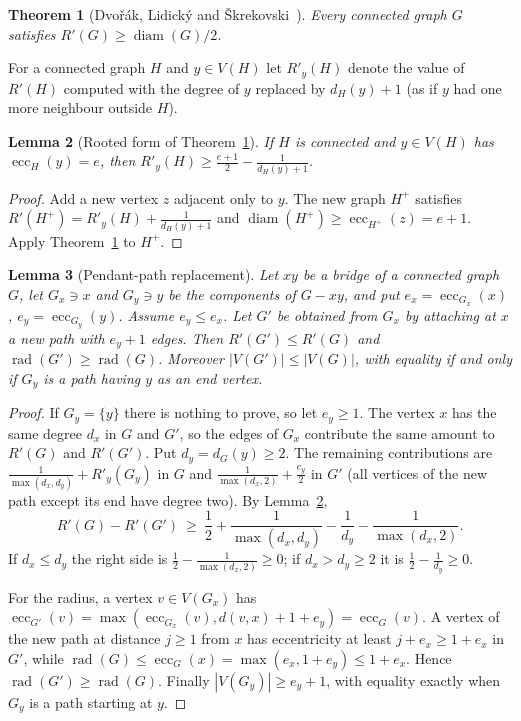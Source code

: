 \documentclass[11pt]{amsart}
\newtheorem{theorem}{Theorem}[section]
\newtheorem{lemma}[theorem]{Lemma}
\theoremstyle{definition}
\DeclareMathOperator{\rad}{rad}
\DeclareMathOperator{\diam}{diam}
\DeclareMathOperator{\ecc}{ecc}
\newcommand{\Rp}{R'}
\begin{document}
\begin{theorem}[Dvo\v{r}\'ak, Lidick\'y and \v{S}krekovski~\cite{DLS}]\label{thm:DLS}
Every connected graph $G$ satisfies $\Rp(G)\ge\diam(G)/2$.
\end{theorem}

For a connected graph $H$ and $y\in V(H)$ let $\Rp_{y}(H)$ denote the value of $\Rp(H)$ computed with the degree of $y$
replaced by $d_H(y)+1$ (as if $y$ had one more neighbour outside $H$).

\begin{lemma}[Rooted form of Theorem~\ref{thm:DLS}]\label{lem:rooted}
If $H$ is connected and $y\in V(H)$ has $\ecc_H(y)=e$, then $\Rp_y(H)\ge\frac{e+1}2-\frac1{d_H(y)+1}$.
\end{lemma}

\begin{proof}
Add a new vertex $z$ adjacent only to $y$. The new graph $H^+$ satisfies $\Rp(H^+)=\Rp_y(H)+\frac1{d_H(y)+1}$ and
$\diam(H^+)\ge\ecc_{H^+}(z)=e+1$. Apply Theorem~\ref{thm:DLS} to $H^+$.
\end{proof}

\begin{lemma}[Pendant-path replacement]\label{lem:replace}
Let $xy$ be a bridge of a connected graph $G$, let $G_x\ni x$ and $G_y\ni y$ be the components of $G-xy$, and put
$e_x=\ecc_{G_x}(x)$, $e_y=\ecc_{G_y}(y)$. Assume $e_y\le e_x$. Let $G'$ be obtained from $G_x$ by attaching at $x$ a
new path with $e_y+1$ edges. Then $\Rp(G')\le\Rp(G)$ and $\rad(G')\ge\rad(G)$. Moreover $|V(G')|\le|V(G)|$, with
equality if and only if $G_y$ is a path having $y$ as an end vertex.
\end{lemma}

\begin{proof}
If $G_y=\{y\}$ there is nothing to prove, so let $e_y\ge1$. The vertex $x$ has the same degree $d_x$ in $G$ and $G'$, so
the edges of $G_x$ contribute the same amount to $\Rp(G)$ and $\Rp(G')$. Put $d_y=d_G(y)\ge2$. The remaining
contributions are $\frac1{\max(d_x,d_y)}+\Rp_y(G_y)$ in $G$ and $\frac1{\max(d_x,2)}+\frac{e_y}2$ in $G'$ (all vertices
of the new path except its end have degree two). By Lemma~\ref{lem:rooted},
\[
\Rp(G)-\Rp(G')\ \ge\ \frac12+\frac1{\max(d_x,d_y)}-\frac1{d_y}-\frac1{\max(d_x,2)} .
\]
If $d_x\le d_y$ the right side is $\frac12-\frac1{\max(d_x,2)}\ge0$; if $d_x>d_y\ge2$ it is $\frac12-\frac1{d_y}\ge0$.

For the radius, a vertex $v\in V(G_x)$ has $\ecc_{G'}(v)=\max(\ecc_{G_x}(v),d(v,x)+1+e_y)=\ecc_G(v)$. A vertex of the
new path at distance $j\ge1$ from $x$ has eccentricity at least $j+e_x\ge1+e_x$ in $G'$, while
$\rad(G)\le\ecc_G(x)=\max(e_x,1+e_y)\le 1+e_x$. Hence $\rad(G')\ge\rad(G)$. Finally $|V(G_y)|\ge e_y+1$, with equality
exactly when $G_y$ is a path starting at $y$.
\end{proof}
\end{document}
